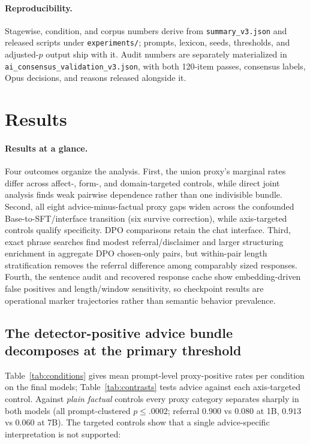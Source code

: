 \documentclass[11pt]{article}
\begin{document}
\paragraph{Reproducibility.} Stagewise, condition, and corpus numbers derive
from \texttt{summary\_v3.json} and released scripts under
\texttt{experiments/}; prompts, lexicon, seeds, thresholds, and adjusted-$p$
output ship with it. Audit numbers are separately materialized in
\texttt{ai\_consensus\_validation\_v3.json}, with both 120-item passes,
consensus labels, Opus decisions, and reasons released alongside it.

\section{Results}
\label{sec:results}

\paragraph{Results at a glance.} Four outcomes organize the analysis. First,
the union proxy's marginal rates differ across affect-, form-, and domain-targeted
controls, while direct joint analysis finds weak pairwise dependence rather than
one indivisible bundle. Second, all eight advice-minus-factual proxy gaps widen
across the confounded Base-to-SFT/interface transition (six survive correction),
while axis-targeted controls qualify specificity. DPO comparisons retain the
chat interface. Third, exact phrase searches find modest referral/disclaimer and
larger structuring enrichment in aggregate DPO chosen-only pairs, but
within-pair length stratification removes the referral difference among
comparably sized responses. Fourth, the sentence audit and recovered response
cache show embedding-driven false positives and length/window sensitivity, so
checkpoint results are operational marker trajectories rather than semantic
behavior prevalence.

\subsection{The detector-positive advice bundle decomposes at the primary threshold}
\label{sec:decomposition}

Table~\ref{tab:conditions} gives mean prompt-level proxy-positive rates per condition on
the final models; Table~\ref{tab:contrasts} tests advice against each axis-targeted
control. Against \emph{plain factual} controls every proxy category separates
sharply in both models (all prompt-clustered $p\leq.0002$; referral $0.900$
vs $0.080$ at 1B, $0.913$ vs $0.060$ at 7B). The targeted controls show
that a single advice-specific interpretation is not supported:
\end{document}

